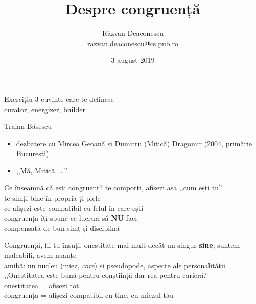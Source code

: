 \documentclass{simple}
\title[Despre congurență]{Despre congruență}
\institute{InfoEducație 2019, Gălăciuc, Vrancea}
\author[Răzvan Deaconescu]{Răzvan Deaconescu \\
razvan.deaconescu@cs.pub.ro}
\date{3 august 2019}
\begin{document}
\frame{\titlepage}

\begin{frame}{Exercițiu}
  \centering
  \pause
  \Large{3 cuvinte care te definesc} \\
  \pause
  \vspace{1cm}
  \Large{curator, energizer, builder}
\end{frame}

\begin{frame}{Traian Băsescu}
  \begin{itemize}
    \pause
    \item dezbatere cu Mircea Geoană și Dumitru (Mitică) Dragomir (2004, primărie București)
    \pause
    \item ,,Mă, Mitică, \ldots''
  \end{itemize}
\end{frame}

\begin{frame}{Ce înseamnă că ești congruent?}
  \centering
  \Large
  \pause
  te comporți, afișezi așa ,,cum ești tu''\\
  \pause
  te simți bine în propria-ți piele\\
  \pause
  ce afișezi este compatibil cu felul în care ești\\
  \pause
  congruența îți spune ce lucruri să \textbf{NU} faci\\
  \pause
  compensată de bun simț și disciplină
\end{frame}

\begin{frame}{Congruență, fii tu însuți, onestitate}
  \centering
  \pause
  mai mult decât un singur \textbf{sine}; suntem maleabili, avem nuanțe \\
  \pause
  amibă: un nucleu (miez, \textit{core}) și pseudopode, aspecte ale personalității \\
  \pause
  ,,Onestitatea este bună pentru conștiință dar rea pentru carieră.'' \\
  \pause
  onestitatea = afișezi tot \\
  \pause
  congruența = afișezi compatibil cu tine, cu miezul tău
\end{frame}
\end{document}
